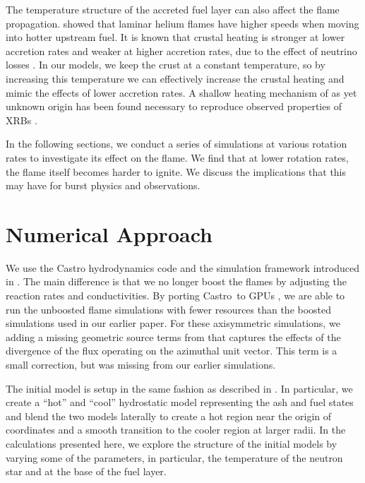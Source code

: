 \documentclass[preprint,times,tighten]{aastex63}
\newcommand{\castro}{{\sf Castro}}
\newcommand{\MarginPar}[1]{
    \marginpar{\vskip-\baselineskip%
               \raggedright%
               \tiny\sffamily%
               {\color{red}\hrule%
               \smallskip%
               #1\par%
               \smallskip%
               \hrule}}%
}
\begin{document}
The temperature structure of the accreted fuel layer can also affect
the flame propagation.  \citet{Timmes00} showed that laminar helium flames 
have higher speeds when moving into hotter upstream fuel.
It is known that crustal heating is stronger at lower
accretion rates and weaker at higher accretion rates, due to the
effect of neutrino losses \citep{Cumming2006,johnston:2019}. In our
models, we keep the crust at a constant temperature, so by increasing
this temperature we can effectively increase the crustal heating and
mimic the effects of lower accretion rates. A shallow heating
mechanism of as yet unknown origin has been found necessary to
reproduce observed properties of XRBs
\citep{Deibel2015,Turlione2015,Keek2017}.

In the following sections, we conduct a series of simulations at various rotation rates to investigate its effect on the flame. We find that at lower rotation rates, the flame itself becomes harder to ignite. We discuss the implications that this may have for burst physics and observations. 


\section{Numerical Approach}\label{Sec:numerics}
\MarginPar{mz}

We use the Castro hydrodynamics code \citep{castro,castro_joss} and the simulation
framework introduced in \citet{flame_wave1}.  The main difference is
that we no longer boost the flames by adjusting the reaction rates and
conductivities.  By porting \castro\ to GPUs \citep{sc20_gpu}, we
are able to run the unboosted flame simulations with fewer resources
than the boosted simulations used in our earlier paper.  For these
axisymmetric simulations, we adding a missing geometric source terms
from \citet{bernard-champmartin} that captures the effects of the
divergence of the flux operating on the azimuthal unit vector.  This
term is a small correction, but was missing from our earlier
simulations.

The initial model is setup in the same fashion as described in
\citet{flame_wave1}.  In particular, we create a ``hot'' and ``cool''
hydrostatic model representing the ash and fuel states and blend the
two models laterally to create a hot region near the origin of
coordinates and a smooth transition to the cooler region at larger
radii.  In the calculations presented here, we explore the structure
of the initial models by varying some of the parameters, in particular, the temperature
of the neutron star and at the base of the fuel layer.
\end{document}
